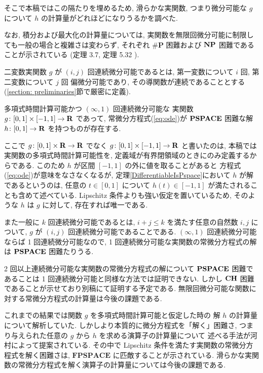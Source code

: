そこで本稿ではこの隔たりを埋めるため, 滑らかな実関数, 
つまり微分可能な $g$ について $h$ の計算量がどれほどになりうるかを調べた.

なお, 積分および最大化の計算量については,
実関数を無限回微分可能に制限しても一般の場合と複雑さは変わらず,
それぞれ $\mathbf{\#P}$ 困難および $\mathbf{NP}$ 困難であることが示されている
(定理 3.7, 定理 5.32 \cite{ko1991complexity}).


二変数実関数 $g$ が $(i, j)$ 回連続微分可能であるとは,
第一変数について $i$ 回, 第二変数について $j$ 回
偏微分可能であり, その導関数が連続であることとする
(\ref{section: preliminaries}節で厳密に定義).

 \begin{theorem}
  \label{DifferentiableIsPspace}
  多項式時間計算可能かつ $(\infty, 1)$ 回連続微分可能な
  実関数 $g \colon [0,1] \times [-1,1] \to \mathbf R$ であって, 
  常微分方程式(\ref{eq:ode})が
  $\mathbf{PSPACE}$ 困難な解 $h \colon [0, 1] \to \mathbf R$ を持つものが存在する.
 \end{theorem}

ここで $g \colon [0,1] \times \mathbf R \to \mathbf R$ でなく
$g \colon [0,1] \times [-1, 1] \to \mathbf R$ と書いたのは, 
本稿では実関数の多項式時間計算可能性を, 
定義域が有界閉領域のときにのみ定義するからである. 
このため $h$ が区間 $[-1, 1]$ の外に値を取ることがあると
方程式(\ref{eq:ode})が意味をなさなくなるが, 
定理\ref{DifferentiableIsPspace}において $h$ が解であるというのは, 
任意の $t \in [0, 1]$ について $h (t) \in [-1, 1]$ が満たされることも含めて述べている.
Lipschitz 条件よりも強い仮定を置いているため, 
そのような $h$ は $g$ に対して, 存在すれば唯一である. 

また一般に $k$ 回連続微分可能であるとは, 
$i+j \le k$ を満たす任意の自然数 $i,j$ について,
$g$ が $(i,j)$ 回連続微分可能であることである.
$(\infty, 1)$ 回連続微分可能ならば 1 回連続微分可能なので,
1 回連続微分可能な実関数の常微分方程式の解は $\mathbf{PSPACE}$ 困難たりうる.

2 回以上連続微分可能な実関数の常微分方程式の解について
$\mathbf{PSPACE}$ 困難であることは 1 回連続微分可能と同様な方法では証明できない.
しかし $\mathbf{CH}$ 困難であることが示せており別稿にて証明する予定である.
無限回微分可能な関数に対する常微分方程式の計算量は今後の課題である.

これまでの結果では関数 $g$ を多項式時間計算可能と仮定した時の
解 $h$ の計算量について解析していた.
しかしより本質的に微分方程式を「解く」困難さ, 
つまり与えられた任意の $g$ から $h$ を求める演算子の計算量について
述べる手法が河村によって提案されている\cite{kawamura2010operators}.
その中で Lipschitz 条件を満たす実関数の常微分方程式を解く困難さは,
$\mathbf{FPSPACE}$ に匹敵することが示されている.
滑らかな実関数の常微分方程式を解く演算子の計算量については今後の課題である.

